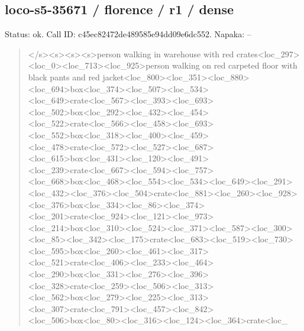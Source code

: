 \documentclass[10pt,a4paper]{article}
\begin{document}
\subsection*{loco-s5-35671 / florence / r1 / dense}
Status: ok. Call ID: c45ec82472de489585e94dd09e6dc552. Napaka: --
\begin{quote}\footnotesize
</s>\allowbreak{}<s>\allowbreak{}<s>\allowbreak{}<s>\allowbreak{}person walking in warehouse with red crates<loc\_297>\allowbreak{}<loc\_0>\allowbreak{}<loc\_713>\allowbreak{}<\allowbreak{}loc\_925>\allowbreak{}person walking on red carpeted floor with black pants and red jacket<loc\_800>\allowbreak{}<loc\_351>\allowbreak{}<loc\_880\allowbreak{}>\allowbreak{}<loc\_694>\allowbreak{}box<loc\_374>\allowbreak{}<loc\_507>\allowbreak{}<\allowbreak{}loc\_534>\allowbreak{}<loc\_649>\allowbreak{}crate<loc\_567>\allowbreak{}<\allowbreak{}loc\_393>\allowbreak{}<loc\_693>\allowbreak{}<loc\_502>\allowbreak{}box<lo\allowbreak{}c\_292>\allowbreak{}<loc\_432>\allowbreak{}<loc\_454>\allowbreak{}<loc\_522\allowbreak{}>\allowbreak{}crate<loc\_566>\allowbreak{}<loc\_458>\allowbreak{}<loc\_693\allowbreak{}>\allowbreak{}<loc\_552>\allowbreak{}box<loc\_318>\allowbreak{}<loc\_400>\allowbreak{}<\allowbreak{}loc\_459>\allowbreak{}<loc\_478>\allowbreak{}crate<loc\_572>\allowbreak{}<\allowbreak{}loc\_527>\allowbreak{}<loc\_687>\allowbreak{}<loc\_615>\allowbreak{}box<lo\allowbreak{}c\_431>\allowbreak{}<loc\_120>\allowbreak{}<loc\_491>\allowbreak{}<loc\_239\allowbreak{}>\allowbreak{}crate<loc\_667>\allowbreak{}<loc\_594>\allowbreak{}<loc\_757\allowbreak{}>\allowbreak{}<loc\_668>\allowbreak{}box<loc\_468>\allowbreak{}<loc\_554>\allowbreak{}<\allowbreak{}loc\_534>\allowbreak{}<loc\_649>\allowbreak{}<loc\_291>\allowbreak{}<loc\_4\allowbreak{}32>\allowbreak{}<loc\_376>\allowbreak{}<loc\_504>\allowbreak{}crate<loc\_8\allowbreak{}81>\allowbreak{}<loc\_260>\allowbreak{}<loc\_928>\allowbreak{}<loc\_376>\allowbreak{}bo\allowbreak{}x<loc\_334>\allowbreak{}<loc\_86>\allowbreak{}<loc\_374>\allowbreak{}<loc\_\allowbreak{}201>\allowbreak{}crate<loc\_924>\allowbreak{}<loc\_121>\allowbreak{}<loc\_\allowbreak{}973>\allowbreak{}<loc\_214>\allowbreak{}box<loc\_310>\allowbreak{}<loc\_52\allowbreak{}4>\allowbreak{}<loc\_371>\allowbreak{}<loc\_587>\allowbreak{}<loc\_300>\allowbreak{}<lo\allowbreak{}c\_85>\allowbreak{}<loc\_342>\allowbreak{}<loc\_175>\allowbreak{}crate<loc\allowbreak{}\_683>\allowbreak{}<loc\_519>\allowbreak{}<loc\_730>\allowbreak{}<loc\_595>\allowbreak{}\allowbreak{}box<loc\_260>\allowbreak{}<loc\_461>\allowbreak{}<loc\_317>\allowbreak{}<l\allowbreak{}oc\_521>\allowbreak{}crate<loc\_406>\allowbreak{}<loc\_233>\allowbreak{}<l\allowbreak{}oc\_464>\allowbreak{}<loc\_290>\allowbreak{}box<loc\_331>\allowbreak{}<loc\allowbreak{}\_276>\allowbreak{}<loc\_396>\allowbreak{}<loc\_328>\allowbreak{}crate<loc\allowbreak{}\_259>\allowbreak{}<loc\_506>\allowbreak{}<loc\_313>\allowbreak{}<loc\_562>\allowbreak{}\allowbreak{}box<loc\_279>\allowbreak{}<loc\_225>\allowbreak{}<loc\_313>\allowbreak{}<l\allowbreak{}oc\_307>\allowbreak{}crate<loc\_791>\allowbreak{}<loc\_457>\allowbreak{}<l\allowbreak{}oc\_842>\allowbreak{}<loc\_506>\allowbreak{}box<loc\_80>\allowbreak{}<loc\_\allowbreak{}316>\allowbreak{}<loc\_124>\allowbreak{}<loc\_364>\allowbreak{}crate<loc\_\allowbr
\end{quote}
\end{document}
